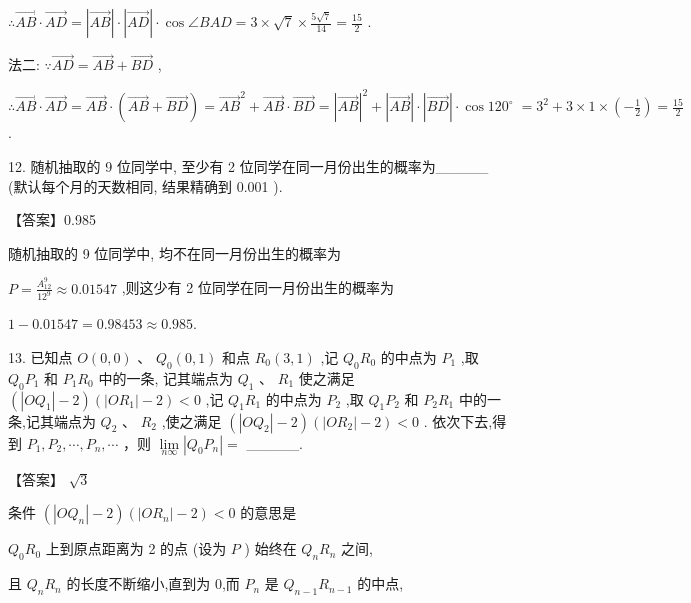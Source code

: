 \documentclass[10pt]{article}
\begin{document}
\(\therefore \overrightarrow{AB} \cdot  \overrightarrow{AD} = \left| \overrightarrow{AB}\right|  \cdot  \left| \overrightarrow{AD}\right|  \cdot  \cos \angle {BAD} = 3 \times  \sqrt{7} \times  \frac{5\sqrt{7}}{14} = \frac{15}{2}\) .

法二: \(\because \overrightarrow{AD} = \overrightarrow{AB} + \overrightarrow{BD}\) ,

\(\therefore \overrightarrow{AB} \cdot  \overrightarrow{AD} = \overrightarrow{AB} \cdot  \left( {\overrightarrow{AB} + \overrightarrow{BD}}\right)  = {\overrightarrow{AB}}^{2} + \overrightarrow{AB} \cdot  \overrightarrow{BD} = {\left| \overrightarrow{AB}\right| }^{2} + \left| \overrightarrow{AB}\right|  \cdot  \left| \overrightarrow{BD}\right|  \cdot  \cos {120}^{ \circ  } \; = {3}^{2} + 3 \times  1 \times  \left( {-\frac{1}{2}}\right)  = \frac{15}{2}\) .

12. 随机抽取的 9 位同学中, 至少有 2 位同学在同一月份出生的概率为\_\_\_\_\_ (默认每个月的天数相同, 结果精确到 0.001 ).

【答案】0.985

随机抽取的 9 位同学中, 均不在同一月份出生的概率为

\(P = \frac{{A}_{12}^{9}}{{12}^{9}} \approx  {0.01547}\) ,则这少有 2 位同学在同一月份出生的概率为

\(1 - {0.01547} = {0.98453} \approx  {0.985}.\)

13. 已知点 \(O\left( {0,0}\right) \text{ 、 }{Q}_{0}\left( {0,1}\right)\) 和点 \({R}_{0}\left( {3,1}\right)\) ,记 \({Q}_{0}{R}_{0}\) 的中点为 \({P}_{1}\) ,取 \({Q}_{0}{P}_{1}\) 和 \({P}_{1}{R}_{0}\) 中的一条, 记其端点为 \({Q}_{1}\text{ 、 }{R}_{1}\) 使之满足 \(\left( {\left| {O{Q}_{1}}\right|  - 2}\right) \left( {\left| {O{R}_{1}}\right|  - 2}\right)  < 0\) ,记 \({Q}_{1}{R}_{1}\) 的中点为 \({P}_{2}\) ,取 \({Q}_{1}{P}_{2}\) 和 \({P}_{2}{R}_{1}\) 中的一条,记其端点为 \({Q}_{2}\text{ 、 }{R}_{2}\) ,使之满足 \(\left( {\left| {O{Q}_{2}}\right|  - 2}\right) \left( {\left| {O{R}_{2}}\right|  - 2}\right)  < 0\) . 依次下去,得到 \({P}_{1},{P}_{2},\cdots ,{P}_{n},\cdots\) ，则 \(\mathop{\lim }\limits_{{n\infty }}\left| {{Q}_{0}{P}_{n}}\right|  =\) \_\_\_\_\_.

【答案】 \(\sqrt{3}\)

条件 \(\left( {\left| {O{Q}_{n}}\right|  - 2}\right) \left( {\left| {O{R}_{n}}\right|  - 2}\right)  < 0\) 的意思是

\({Q}_{0}{R}_{0}\) 上到原点距离为 2 的点 (设为 \(P\) ) 始终在 \({Q}_{n}{R}_{n}\) 之间,

且 \({Q}_{n}{R}_{n}\) 的长度不断缩小,直到为 0,而 \({P}_{n}\) 是 \({Q}_{n - 1}{R}_{n - 1}\) 的中点,
\end{document}
